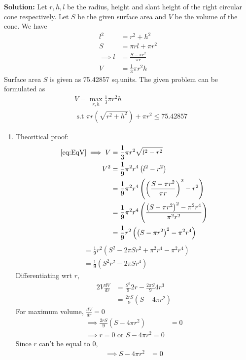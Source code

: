 \documentclass[12pt]{article}
\providecommand{\brak}[1]{\ensuremath{\left(#1\right)}}
\newcommand{\solution}{\noindent \textbf{Solution: }}
\begin{document}
\begin{enumerate}
\solution 
Let $r,h,l$ be the radius, height and slant height of the right circular cone respectively. Let $S$ be the given surface area and $V$ be the volume of the cone. We have 
\begin{align}
	l^2 &= r^2 + h^2 \\
	S &= \pi rl + \pi r^2 \\
	\implies l &= \frac{S-\pi r^2}{\pi r}\\
	\label{eq:EqV}
	V &= \frac{1}{3}\pi r^2h 
\end{align}
Surface area $S$ is given as 75.42857 sq.units. The given problem can be formulated as 
\begin{align}
	\label{eq:EqMax}
	& V = \max_{r,h} \frac{1}{3}\pi r^2h \\
	\label{eq:EqConstr}
	&\text { s.t } \pi r\brak{\sqrt{r^2+h^2}} + \pi r^2 \leq 75.42857 
\end{align}
\begin{enumerate}
\item Theoritical proof:
\begin{align}
	\eqref{eq:EqV} \implies V &= \frac{1}{3}\pi r^2\sqrt{l^2-r^2} \\
	V^2 &= \frac{1}{9}\pi^2 r^4\brak{l^2-r^2} \\
	&= \frac{1}{9}\pi^2 r^4\brak{\brak{\frac{S-\pi r^2}{\pi r}}^2-r^2} \\
	&= \frac{1}{9}\pi^2 r^4\brak{\frac{\brak{S-\pi r^2}^2-\pi^2r^4 }{\pi^2 r^2}} \\
	&= \frac{1}{9} r^2\brak{\brak{S-\pi r^2}^2-\pi^2r^4 }
\end{align}
\begin{align}
	&= \frac{1}{9} r^2\brak{S^2- 2\pi S r^2 + \pi^2r^4 -\pi^2r^4 } \\
	&= \frac{1}{9} \brak{S^2r^2- 2\pi S r^4 } 
\end{align}
Differentiating wrt $r$,
\begin{align}
	\label{eq:EqDer}
	2V \frac{dV}{dr} &= \frac{S^2}{9}2r - \frac{2\pi S}{9}4r^3 \\ 
	&= \frac{2rS}{9}\brak{ S- 4\pi r^2} 
\end{align}
For maximum volume, $\frac{dV}{dr} = 0$
\begin{align}
 	\implies  \frac{2rS}{9}\brak{ S- 4\pi r^2} &= 0 \\ 
	\implies r = 0 \text{ or } S - 4\pi r^2 = 0 
\end{align}
Since $r$ can't be equal to 0,
\begin{align}
	\implies S - 4\pi r^2 &= 0 \\

\end{align}
\end{enumerate}
\end{enumerate}
\end{document}
